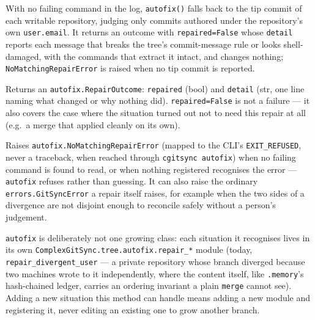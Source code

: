 With no failing command in the log, \texttt{autofix()} falls back to the tip
commit of each writable repository, judging only commits authored under the
repository's own \texttt{user.email}. It returns an outcome with
\texttt{repaired=False} whose \texttt{detail} reports each message that breaks
the tree's commit-message rule or looks shell-damaged, with the commands that
extract it intact, and changes nothing; \texttt{NoMatchingRepairError} is
raised when no tip commit is reported.

Returns an \texttt{autofix.RepairOutcome}: \texttt{repaired} (bool) and
\texttt{detail} (str, one line naming what changed or why nothing did).
\texttt{repaired=False} is not a failure --- it also covers the case
where the situation turned out not to need this repair at all (e.g.\ a
merge that applied cleanly on its own).

Raises \texttt{autofix.NoMatchingRepairError} (mapped to the CLI's
\texttt{EXIT\_REFUSED}, never a traceback, when reached through
\texttt{cgitsync autofix}) when no failing command is found to read, or
when nothing registered recognises the error --- \texttt{autofix} refuses
rather than guessing. It can also raise the ordinary
\texttt{errors.GitSyncError} a repair itself raises, for example when the
two sides of a divergence are not disjoint enough to reconcile safely
without a person's judgement.

\texttt{autofix} is deliberately not one growing class: each situation it
recognises lives in its own \texttt{ComplexGitSync.tree.autofix.repair\_*}
module (today, \texttt{repair\_divergent\_user} --- a private repository
whose branch diverged because two machines wrote to it independently,
where the content itself, like \texttt{.memory}'s hash-chained ledger,
carries an ordering invariant a plain \texttt{merge} cannot see). Adding
a new situation this method can handle means adding a new module and
registering it, never editing an existing one to grow another branch.
